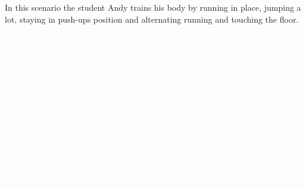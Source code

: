 \documentclass[twocolumn,showpacs,%
  nofootinbib,aps,superscriptaddress,%
  eqsecnum,prd,notitlepage,showkeys,10pt]{revtex4-1}
\begin{document}
In this scenario the student Andy trains his body by running in place, jumping a lot, staying in push-ups position and alternating running and touching the floor.

\textcolor{white}{
Text Text Text Text Text Text Text Text Text Text Text Text Text Text Text Text Text Text Text Text Text Text Text Text Text Text Text Text Text Text Text Text Text Text Text Text Text Text Text Text Text Text Text Text Text Text
Text Text Text Text Text Text Text Text Text Text Text Text Text Text Text Text Text Text Text Text Text Text Text Text Text Text Text Text Text Text Text Text Text Text Text Text Text Text Text Text Text Text Text Text Text Text
Text Text Text Text Text Text Text Text Text Text Text Text Text Text Text Text Text Text Text Text Text Text Text Text Text Text Text Text Text Text Text Text Text Text Text Text Text Text Text Text Text Text Text Text Text Text
Text Text Text Text Text Text Text Text Text Text Text Text Text Text Text Text Text Text Text Text Text Text Text Text Text Text Text Text Text Text Text Text Text Text Text Text Text Text Text Text Text Text Text Text Text Text
}
\end{document}
